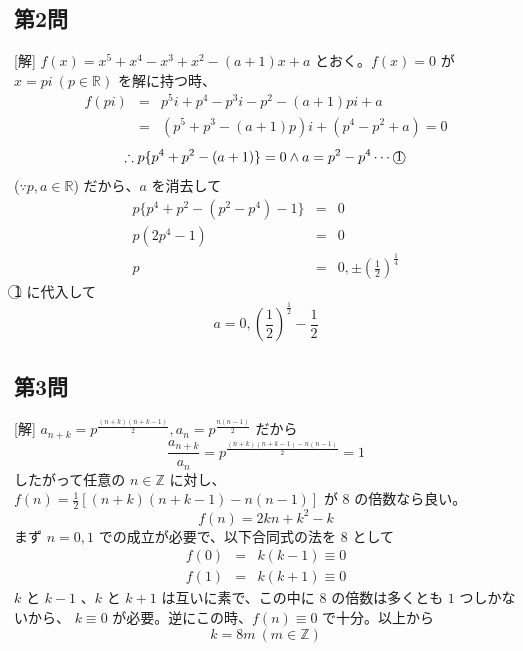 \documentclass[../main.tex]{subfiles}
\begin{document}
\begin{center}
\end{center}

\subsection*{第2問}
[解] $f(x) = x^5+x^4-x^3+x^2-(a+1)x+a$ とおく。$f(x)=0$ が $x = pi \ (p \in \mathbb{R})$ を解に持つ時、
\begin{eqnarray*}
  f(pi) &=& p^5 i + p^4 - p^3 i - p^2 - (a+1)pi + a \\
  &=& (p^5+p^3-(a+1)p) i + (p^4-p^2+a) = 0
\end{eqnarray*}
\[ \therefore p\{p^4+p^2-(a+1)\} = 0 \land a = p^2-p^4 \cdots \text{\textcircled{1}} \]
($\because p, a \in \mathbb{R}$)
だから、$a$ を消去して
\begin{eqnarray*}
  p \{ p^4+p^2-(p^2-p^4)-1 \} &=& 0 \\
  p (2p^4-1) &=& 0 \\
  p &=& 0, \pm \left(\frac{1}{2}\right)^{\frac{1}{4}}
\end{eqnarray*}
\textcircled{1} に代入して
\[ a = 0, \left(\frac{1}{2}\right)^{\frac{1}{2}} - \frac{1}{2} \]

\subsection*{第3問}
[解] $a_{n+k} = p^{\frac{(n+k)(n+k-1)}{2}}, a_n = p^{\frac{n(n-1)}{2}}$ だから
\[ \frac{a_{n+k}}{a_n} = p^{\frac{(n+k)(n+k-1)-n(n-1)}{2}} = 1 \]
したがって任意の $n \in \mathbb{Z}$ に対し、$f(n) = \frac{1}{2} [ (n+k)(n+k-1)-n(n-1) ]$ が $8$ の倍数なら良い。
\[ f(n) = 2kn + k^2 - k \]
まず $n=0, 1$ での成立が必要で、以下合同式の法を $8$ として
\begin{eqnarray*}
  f(0) &=& k(k-1) \equiv 0 \\
  f(1) &=& k(k+1) \equiv 0
\end{eqnarray*}
$k$ と $k-1$ 、$k$ と $k+1$ は互いに素で、この中に $8$ の倍数は多くとも $1$ つしかないから、
$k \equiv 0$ が必要。逆にこの時、$f(n) \equiv 0$ で十分。以上から
\[ k = 8m \ (m \in \mathbb{Z}) \]
\end{document}
